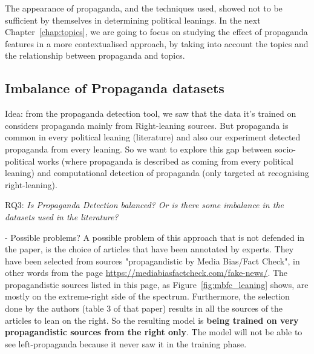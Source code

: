 The appearance of propaganda, and the techniques used, showed not to be sufficient by themselves in determining political leanings. In the next Chapter~\ref{chap:topics}, we are going to focus on studying the effect of propaganda features in a more contextualised approach, by taking into account the topics and the relationship between propaganda and topics.








\subsection{\statusorange Imbalance of Propaganda datasets}
\label{ssec:ps_prop_leaning_unbalanced}




Idea: from the propaganda detection tool, we saw that the data it’s trained on considers propaganda mainly from Right-leaning sources. But propaganda is common in every political leaning (literature) and also our experiment detected propaganda from every leaning. So we want to explore this gap between socio-political works (where propaganda is described as coming from every political leaning) and computational detection of propaganda (only targeted at recognising right-leaning).



RQ3: \emph{Is Propaganda Detection balanced? Or is there some imbalance in the datasets used in the literature?}


- Possible problems?
A possible problem of this approach that is not defended in the paper, is the choice of articles that have been annotated by experts. They have been selected from sources "propagandistic by Media Bias/Fact Check", in other words from the page \url{https://mediabiasfactcheck.com/fake-news/}. The propagandistic sources listed in this page, as Figure~\ref{fig:mbfc_leaning} shows, are mostly on the extreme-right side of the spectrum. Furthermore, the selection done by the authors (table 3 of that paper) results in all the sources of the articles to lean on the right.
So the resulting model is \textbf{being trained on very propagandistic sources from the right only}. The model will not be able to see left-propaganda because it never saw it in the training phase.

